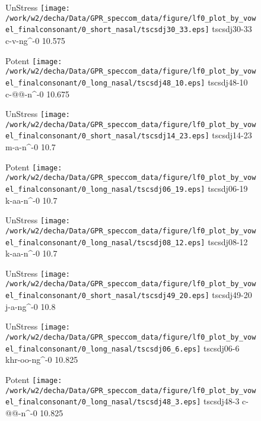 \documentclass{article}
\begin{document}
\begin{figure}[t]
\begin{minipage}[b]{.24\textwidth}
UnStress
\centering
\texttt{[image: /work/w2/decha/Data/GPR\_speccom\_data/figure/lf0\_plot\_by\_vowel\_finalconsonant/0\_short\_nasal/tscsdj30\_33.eps]}
tscsdj30-33 c-v-ng\textasciicircum-0 10.575
\end{minipage}
\begin{minipage}[b]{.24\textwidth}
\colorbox{Apricot}{Potent}
\centering
\texttt{[image: /work/w2/decha/Data/GPR\_speccom\_data/figure/lf0\_plot\_by\_vowel\_finalconsonant/0\_long\_nasal/tscsdj48\_10.eps]}
tscsdj48-10 c-@@-n\textasciicircum-0 10.675
\end{minipage}
\begin{minipage}[b]{.24\textwidth}
UnStress
\centering
\texttt{[image: /work/w2/decha/Data/GPR\_speccom\_data/figure/lf0\_plot\_by\_vowel\_finalconsonant/0\_short\_nasal/tscsdj14\_23.eps]}
tscsdj14-23 m-a-n\textasciicircum-0 10.7
\end{minipage}
\begin{minipage}[b]{.24\textwidth}
\colorbox{Apricot}{Potent}
\centering
\texttt{[image: /work/w2/decha/Data/GPR\_speccom\_data/figure/lf0\_plot\_by\_vowel\_finalconsonant/0\_long\_nasal/tscsdj06\_19.eps]}
tscsdj06-19 k-aa-n\textasciicircum-0 10.7
\end{minipage}
\end{figure}

\begin{figure}[t]
\begin{minipage}[b]{.24\textwidth}
UnStress
\centering
\texttt{[image: /work/w2/decha/Data/GPR\_speccom\_data/figure/lf0\_plot\_by\_vowel\_finalconsonant/0\_long\_nasal/tscsdj08\_12.eps]}
tscsdj08-12 k-aa-n\textasciicircum-0 10.7
\end{minipage}
\begin{minipage}[b]{.24\textwidth}
UnStress
\centering
\texttt{[image: /work/w2/decha/Data/GPR\_speccom\_data/figure/lf0\_plot\_by\_vowel\_finalconsonant/0\_short\_nasal/tscsdj49\_20.eps]}
tscsdj49-20 j-a-ng\textasciicircum-0 10.8
\end{minipage}
\begin{minipage}[b]{.24\textwidth}
UnStress
\centering
\texttt{[image: /work/w2/decha/Data/GPR\_speccom\_data/figure/lf0\_plot\_by\_vowel\_finalconsonant/0\_long\_nasal/tscsdj06\_6.eps]}
tscsdj06-6 khr-oo-ng\textasciicircum-0 10.825
\end{minipage}
\begin{minipage}[b]{.24\textwidth}
\colorbox{Apricot}{Potent}
\centering
\texttt{[image: /work/w2/decha/Data/GPR\_speccom\_data/figure/lf0\_plot\_by\_vowel\_finalconsonant/0\_long\_nasal/tscsdj48\_3.eps]}
tscsdj48-3 c-@@-n\textasciicircum-0 10.825
\end{minipage}
\end{figure}
\end{document}
